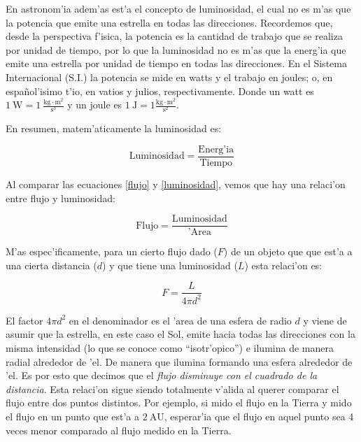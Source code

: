 \documentclass{article}
\begin{document}
\begin{enumerate}[a)]
En astronom'ia adem'as est'a el concepto de luminosidad, el cual no es m'as que la potencia que emite una estrella en todas las direcciones. Recordemos que, desde la perspectiva f'isica, la potencia es la cantidad de trabajo que se realiza por unidad de tiempo, por lo que la luminosidad no es m'as que la energ'ia que emite una estrella por unidad de tiempo en todas las direcciones. En el Sistema Internacional (S.I.) la potencia se mide en watts y el trabajo en joules; o, en español'isimo t'io, en vatios y julios, respectivamente. Donde un watt es $1 \ \text{W} = 1 \ \frac{\text{kg} \cdot \text{m}^2}{\text{s}^3}$ y un joule es $1 \ \text{J} = 1 \frac{\text{kg} \cdot \text{m}^2}{\text{s}^2}$.

En resumen, matem'aticamente la luminosidad es:

\begin{equation} \label{luminosidad}
\text{Luminosidad} = \frac{\text{Energ'ia}}{\text{Tiempo}}
\end{equation}

Al comparar las ecuaciones \eqref{flujo} y \eqref{luminosidad}, vemos que hay una relaci'on entre flujo y luminosidad:

\begin{equation}
\text{Flujo} = \frac{\text{Luminosidad}}{\text{'Area}}
\end{equation}

M'as espec'ificamente, para un cierto flujo dado ($F$) de un objeto que que est'a a una cierta distancia ($d$) y que tiene una luminosidad ($L$) esta relaci'on es:

\begin{equation} \label{flujo_eq}
F = \frac{L}{4 \pi d^2}
\end{equation}

El factor $4 \pi d^2$ en el denominador es el 'area de una esfera de radio $d$  y viene de asumir que la estrella, en este caso el Sol, emite hacia  todas las direcciones con la misma intensidad (lo que se conoce como ``isotr'opico'') e ilumina de manera radial alrededor de 'el. De manera que ilumina formando una esfera alrededor de 'el. Es por esto que decimos que el \emph{flujo disminuye con el cuadrado de la distancia}. Esta relaci'on sigue siendo totalmente v'alida al querer comparar el flujo entre dos puntos distintos. Por ejemplo, si mido el flujo en la Tierra y mido el flujo en un punto que est'a a $2 \ \text{AU}$, esperar'ia que el flujo en aquel punto sea 4 veces menor comparado al flujo medido en la Tierra.


\end{enumerate}
\end{document}
